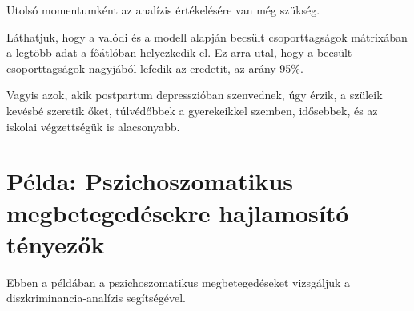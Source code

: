 \documentclass[
  letterpaper,
]{krantz}
\makeatletter
\newenvironment{Shaded}{\begin{snugshade}}{\end{snugshade}}
\newcommand{\AttributeTok}[1]{\textcolor[rgb]{0.40,0.45,0.13}{#1}}
\newcommand{\CommentTok}[1]{\textcolor[rgb]{0.37,0.37,0.37}{#1}}
\newcommand{\DecValTok}[1]{\textcolor[rgb]{0.68,0.00,0.00}{#1}}
\newcommand{\FunctionTok}[1]{\textcolor[rgb]{0.28,0.35,0.67}{#1}}
\newcommand{\NormalTok}[1]{\textcolor[rgb]{0.00,0.23,0.31}{#1}}
\newcommand{\OtherTok}[1]{\textcolor[rgb]{0.00,0.23,0.31}{#1}}
\newcommand{\SpecialCharTok}[1]{\textcolor[rgb]{0.37,0.37,0.37}{#1}}
\newcommand{\StringTok}[1]{\textcolor[rgb]{0.13,0.47,0.30}{#1}}
\newenvironment{kframe}{%
\medskip{}
\setlength{\fboxsep}{.8em}
 \def\at@end@of@kframe{}%
 \ifinner\ifhmode%
  \def\at@end@of@kframe{\end{minipage}}%
  \begin{minipage}{\columnwidth}%
 \fi\fi%
 \def\FrameCommand##1{\hskip\@totalleftmargin \hskip-\fboxsep
 \colorbox{shadecolor}{##1}\hskip-\fboxsep
     \hskip-\linewidth \hskip-\@totalleftmargin \hskip\columnwidth}%
 \MakeFramed {\advance\hsize-\width
   \@totalleftmargin\z@ \linewidth\hsize
   \@setminipage}}%
 {\par\unskip\endMakeFramed%
 \at@end@of@kframe}
\renewenvironment{Shaded}{\begin{kframe}}{\end{kframe}}
\makeatother
\begin{document}
Utolsó momentumként az analízis értékelésére van még szükség.

\begin{Shaded}
\end{Shaded}

Láthatjuk, hogy a valódi és a modell alapján becsült csoporttagságok
mátrixában a legtöbb adat a főátlóban helyezkedik el. Ez arra utal, hogy
a becsült csoporttagságok nagyjából lefedik az eredetit, az arány 95\%.

Vagyis azok, akik postpartum depresszióban szenvednek, úgy érzik, a
szüleik kevésbé szeretik őket, túlvédőbbek a gyerekeikkel szemben,
idősebbek, és az iskolai végzettségük is alacsonyabb.

\hypertarget{puxe9lda-pszichoszomatikus-megbetegeduxe9sekre-hajlamosuxedtuxf3-tuxe9nyezux151k}{%
\section{Példa: Pszichoszomatikus megbetegedésekre hajlamosító
tényezők}\label{puxe9lda-pszichoszomatikus-megbetegeduxe9sekre-hajlamosuxedtuxf3-tuxe9nyezux151k}}

Ebben a példában a pszichoszomatikus megbetegedéseket vizsgáljuk a
diszkriminancia-analízis segítségével.
\end{document}
